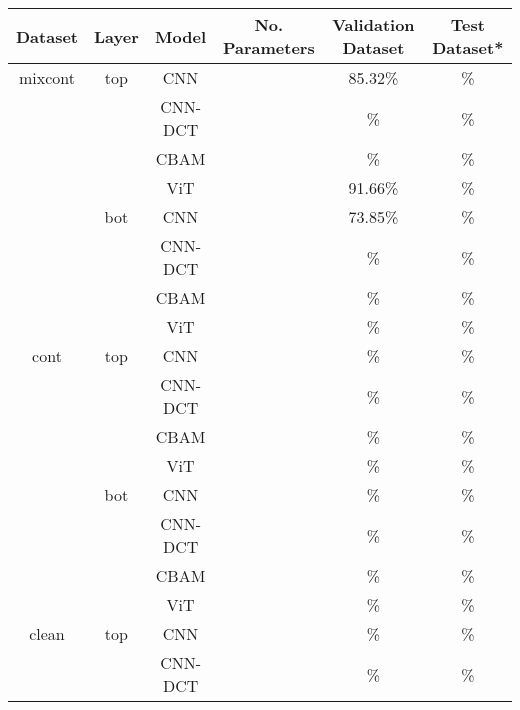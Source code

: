 \begin{table}[H]
    \centering
    \begin{tabular}{c|c|c|c|c|c}
        Dataset & Layer & Model   & No. Parameters & Validation Dataset  & Test Dataset*    \\
        \hline
        mixcont & top   & CNN     &                &  85.32\%              &        \% \\
                &       & CNN-DCT &                &       \%              &         \% \\
                &       & CBAM    &                &       \%              &         \% \\
                &       & ViT     &                &  91.66\%              &          \% \\
                & bot   & CNN     &                &  73.85\%              &          \%  \\
                &       & CNN-DCT &                &       \%              &          \%  \\
                &       & CBAM    &                &       \%              &         \% \\
                &       & ViT     &                &       \%              &           \% \\
        \hline
        cont    & top   & CNN     &                &       \%              &        \% \\
                &       & CNN-DCT &                &       \%              &         \% \\
                &       & CBAM    &                &       \%              &         \% \\
                &       & ViT     &                &       \%              &         \% \\
                & bot   & CNN     &                &       \%              &          \%  \\
                &       & CNN-DCT &                &       \%              &          \%  \\
                &       & CBAM    &                &       \%              &         \% \\
                &       & ViT     &                &       \%              &           \% \\
        \hline
        clean   & top   & CNN     &                &       \%              &        \% \\
                &       & CNN-DCT &                &       \%              &         \% \\

\end{tabular}
\end{table}
